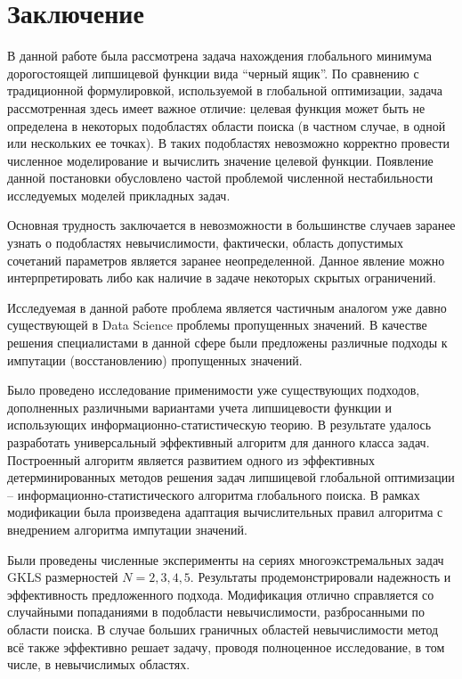 \documentclass[10pt,a4paper]{book}
\begin{document}
\section{Заключение}

В данной работе была рассмотрена задача нахождения глобального минимума дорогостоящей липшицевой функции вида ``черный ящик''. По сравнению с традиционной формулировкой, используемой в глобальной оптимизации, задача рассмотренная здесь имеет важное отличие: целевая функция может быть не определена в некоторых подобластях области поиска (в частном случае, в одной или нескольких ее точках). В таких подобластях невозможно корректно провести численное моделирование и вычислить значение целевой функции. Появление данной постановки обусловлено частой проблемой численной нестабильности исследуемых моделей прикладных задач.

Основная трудность заключается в невозможности в большинстве случаев заранее узнать о подобластях невычислимости, фактически, область допустимых сочетаний параметров является заранее неопределенной. Данное явление можно интерпретировать либо как наличие в задаче некоторых скрытых ограничений.

Исследуемая в данной работе проблема является частичным аналогом уже давно существующей в Data Science проблемы пропущенных значений. В качестве решения специалистами в данной сфере были предложены различные подходы к импутации (восстановлению) пропущенных значений. %

Было проведено исследование применимости уже существующих подходов, дополненных различными вариантами учета липшицевости функции и использующих информационно-статистическую теорию. В результате удалось разработать универсальный эффективный алгоритм для данного класса задач. Построенный алгоритм является развитием одного из эффективных детерминированных методов решения задач липшицевой глобальной оптимизации – информационно-статистического алгоритма глобального поиска. В рамках модификации была произведена адаптация вычислительных правил алгоритма с внедрением алгоритма импутации значений.

Были проведены численные эксперименты на сериях многоэкстремальных задач GKLS размерностей $N = 2,3,4,5$. Результаты продемонстрировали надежность и эффективность предложенного подхода. Модификация отлично справляется со случайными попаданиями в подобласти невычислимости, разбросанными по области поиска. В случае больших граничных областей невычислимости метод всё также эффективно решает задачу, проводя полноценное исследование, в том числе, в невычислимых областях.
\end{document}
